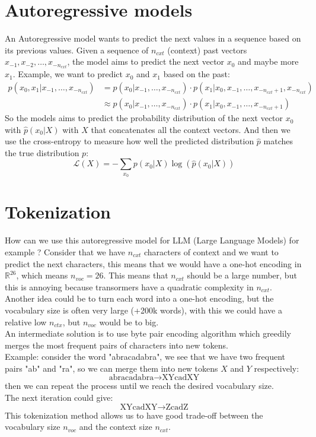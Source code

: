 \documentclass[12pt, openany]{report}
\newcommand{\R}{\mathbb{R}}
\newcommand{\Lo}{\mathcal{L}}
\theoremstyle{definition}
\begin{document}
\section{Autoregressive models}
An Autoregressive model wants to predict the next values in a sequence based on its previous values. Given a sequence of $n_{cxt}$ (context) past vectors $x_{-1}, x_{-2}, \ldots, x_{-n_{cxt}}$, the model aims to predict the next vector $x_0$ and maybe more $x_1$. Example, we want to predict $x_0$ and $x_1$ based on the past:
\begin{equation}
  \begin{aligned}
    p(x_0, x_1 | x_{-1}, \ldots, x_{-n_{cxt}}) &= p(x_0 | x_{-1}, \ldots, x_{-n_{cxt}}) \cdot p(x_1 | x_0, x_{-1}, \ldots, x_{-n_{cxt} + 1}, x_{-n_{cxt}}) \\
    &\approx p(x_0 | x_{-1}, \ldots, x_{-n_{cxt}}) \cdot p(x_1 | x_0, x_{-1}, \ldots, x_{-n_{cxt} + 1})
  \end{aligned} 
\end{equation}
So the models aims to predict the probability distribution of the next vector $x_0$ with $\hat{p}(x_0 | X)$ with $X$ that concatenates all the context vectors. And then we use the cross-entropy to measure how well the predicted distribution $\hat{p}$ matches the true distribution $p$:
\begin{equation}
  \Lo(X) = - \sum_{x_0} p(x_0 | X) \log(\hat{p}(x_0 | X))
\end{equation}
\section{Tokenization}
How can we use this autoregressive model for LLM (Large Language Models) for example ? Consider that we have $n_{cxt}$ characters of context and we want to predict the next characters, this means that we would have a one-hot encoding in $\R^{26}$, which means $n_{voc} = 26$. This means that $n_{cxt}$ should be a large number, but this is annoying because transormers have a quadratic complexity in $n_{cxt}$.\\ 
Another idea could be to turn each word into a one-hot encoding, but the vocabulary size is often very large (+200k words), with this we could have a relative low $n_{ctx}$, but $n_{voc}$ would be to big.\\
An intermediate solution is to use byte pair encoding algorithm which greedily merges the most frequent pairs of characters into new tokens.\\ 
Example: consider the word "abracadabra", we see that we have two frequent pairs "ab" and "ra", so we can merge them into new tokens $X$ and $Y$ respectively:
\begin{equation}
  \text{abracadabra} \rightarrow \text{XYcadXY}
\end{equation}
then we can repeat the process until we reach the desired vocabulary size.\\ The next iteration could give:
\begin{equation}
  \text{XYcadXY} \rightarrow \text{ZcadZ}
\end{equation}
This tokenization method allows us to have good trade-off between the vocabulary size $n_{voc}$ and the context size $n_{cxt}$.\\
\end{document}
